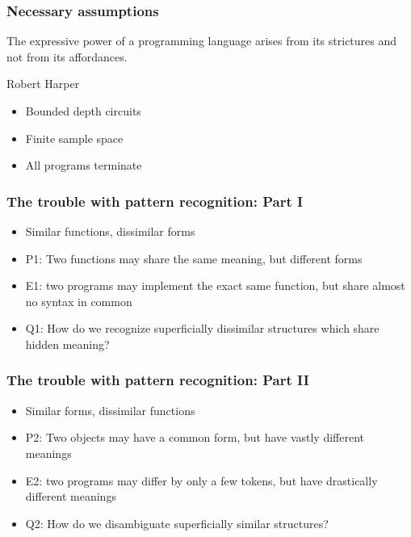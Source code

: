 \documentclass{beamer}
\begin{document}
  \begin{frame}
    \frametitle{Necessary assumptions}
    \setlength{\epigraphwidth}{0.5\textwidth}
    \epigraph{The expressive power of a programming language arises from its strictures and not from its affordances.}{Robert Harper}
    \begin{itemize}
      \item Bounded depth circuits
      \item Finite sample space
      \item All programs terminate
    \end{itemize}
  \end{frame}

  \begin{frame}
    \frametitle{The trouble with pattern recognition: Part I}
    \begin{itemize}
      \item Similar functions, dissimilar forms
      \item P1: Two functions may share the same meaning, but different forms
      \item E1: two programs may implement the exact same function, but share almost no syntax in common
      \item Q1: How do we recognize superficially dissimilar structures which share hidden meaning?
    \end{itemize}
  \end{frame}

  \begin{frame}
    \frametitle{The trouble with pattern recognition: Part II}
    \begin{itemize}
      \item Similar forms, dissimilar functions
      \item P2: Two objects may have a common form, but have vastly different meanings
      \item E2: two programs may differ by only a few tokens, but have drastically different meanings
      \item Q2: How do we disambiguate superficially similar structures?
    \end{itemize}
  \end{frame}
\end{document}
